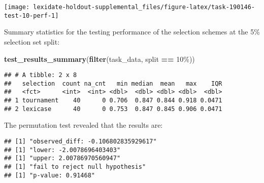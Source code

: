 \documentclass[
]{book}
\newenvironment{Shaded}{\begin{snugshade}}{\end{snugshade}}
\newcommand{\AttributeTok}[1]{\textcolor[rgb]{0.13,0.29,0.53}{#1}}
\newcommand{\DecValTok}[1]{\textcolor[rgb]{0.00,0.00,0.81}{#1}}
\newcommand{\FunctionTok}[1]{\textcolor[rgb]{0.13,0.29,0.53}{\textbf{#1}}}
\newcommand{\NormalTok}[1]{#1}
\newcommand{\OtherTok}[1]{\textcolor[rgb]{0.56,0.35,0.01}{#1}}
\newcommand{\SpecialCharTok}[1]{\textcolor[rgb]{0.81,0.36,0.00}{\textbf{#1}}}
\newcommand{\StringTok}[1]{\textcolor[rgb]{0.31,0.60,0.02}{#1}}
\begin{document}
\texttt{[image: lexidate-holdout-supplemental\_files/figure-latex/task-190146-test-10-perf-1]}

Summary statistics for the testing performance of the selection schemes at the 5\% selection set split:

\begin{Shaded}
\begin{Highlighting}[]
\FunctionTok{test\_results\_summary}\NormalTok{(}\FunctionTok{filter}\NormalTok{(task\_data, split }\SpecialCharTok{==} \StringTok{\textquotesingle{}10\%\textquotesingle{}}\NormalTok{))}
\end{Highlighting}
\end{Shaded}

\begin{verbatim}
## # A tibble: 2 x 8
##   selection  count na_cnt   min median  mean   max    IQR
##   <fct>      <int>  <int> <dbl>  <dbl> <dbl> <dbl>  <dbl>
## 1 tournament    40      0 0.706  0.847 0.844 0.918 0.0471
## 2 lexicase      40      0 0.753  0.847 0.845 0.906 0.0471
\end{verbatim}

The permutation test revealed that the results are:

\begin{Shaded}
\end{Shaded}

\begin{verbatim}
## [1] "observed_diff: -0.106802835929617"
## [1] "lower: -2.0078696403403"
## [1] "upper: 2.00786970560947"
## [1] "fail to reject null hypothesis"
## [1] "p-value: 0.91468"
\end{verbatim}
\end{document}
